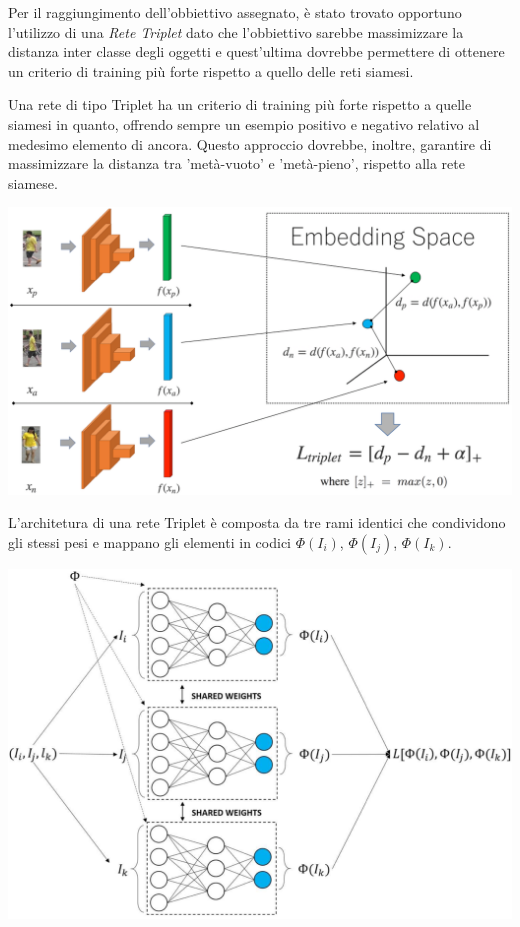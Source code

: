 \documentclass[11pt]{article}
\begin{document}
Per il raggiungimento
dell'obbiettivo assegnato, è stato trovato opportuno l'utilizzo di una \textit{Rete Triplet} dato che l'obbiettivo sarebbe massimizzare la distanza inter classe degli oggetti
e quest'ultima dovrebbe permettere di ottenere un criterio di training più forte rispetto a quello
delle reti siamesi.

Una rete di tipo Triplet ha un criterio di training più forte rispetto a quelle siamesi in quanto, offrendo sempre un esempio positivo e negativo relativo
al medesimo elemento di ancora. Questo approccio dovrebbe, inoltre, garantire di massimizzare la distanza
tra 'metà-vuoto' e 'metà-pieno', rispetto alla rete siamese.

\begin{center}
    \begin{minipage}{0.6\linewidth}
    \includegraphics[width=\linewidth]{01.png}
    \end{minipage}
\end{center}

L'architetura di una rete Triplet è composta da tre rami identici che condividono gli stessi pesi e mappano gli elementi in codici $\Phi(I_i)$, $\Phi(I_j)$, $\Phi(I_k)$.

\begin{center}
    \begin{minipage}{0.5\linewidth}
    \includegraphics[width=\linewidth]{02.png}
    \end{minipage}
\end{center}
\end{document}
